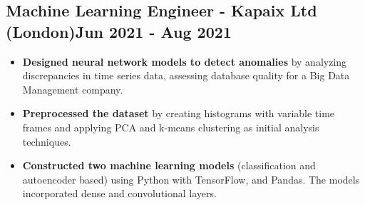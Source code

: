 \documentclass[]{article}
\begin{document}
\vspace{2ex}

\subsection{\large{Machine Learning Engineer - Kapaix Ltd} (London)\hfill{\small{Jun 2021 - Aug 2021}}}

\begin{itemize}
    \item \textbf{Designed neural network models to detect anomalies} by analyzing discrepancies in time series data, assessing database quality for a Big Data Management company.
    \item \textbf{Preprocessed the dataset} by creating histograms with variable time frames and applying PCA and k-means clustering as initial analysis techniques.
    \item \textbf{Constructed two machine learning models} (classification and autoencoder based) using Python with TensorFlow, and Pandas. The models incorporated dense and convolutional layers.
\end{itemize}
\end{document}
